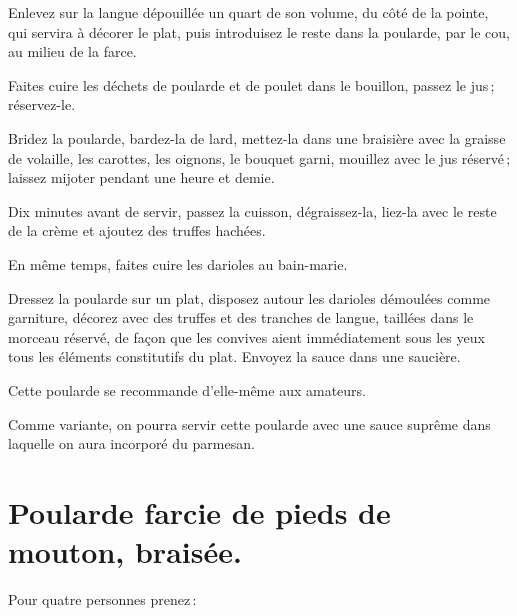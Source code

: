 Enlevez sur la langue dépouillée un quart de son volume, du côté de la pointe,
qui servira à décorer le plat, puis introduisez le reste dans la poularde, par
le cou, au milieu de la farce.

Faites cuire les déchets de poularde et de poulet dans le bouillon, passez le jus ;
réservez-le.

Bridez la poularde, bardez-la de lard, mettez-la dans une braisière avec la
graisse de volaille, les carottes, les oignons, le bouquet garni, mouillez avec
le jus réservé ; laissez mijoter pendant une heure et demie.

Dix minutes avant de servir, passez la cuisson, dégraissez-la, liez-la avec le reste
de la crème et ajoutez des truffes hachées.

En même temps, faites cuire les darioles au bain-marie.

Dressez la poularde sur un plat, disposez autour les darioles démoulées comme
garniture, décorez avec des truffes et des tranches de langue, taillées dans le
morceau réservé, de façon que les convives aient immédiatement sous les yeux
tous les éléments constitutifs du plat. Envoyez la sauce dans une saucière.

Cette poularde se recommande d'elle-même aux amateurs.

\sk

Comme variante, on pourra servir cette poularde avec une sauce suprême dans
laquelle on aura incorporé du parmesan.

\section*{\centering Poularde farcie de pieds de mouton, braisée.}
{}

Pour quatre personnes prenez :

\medskip

